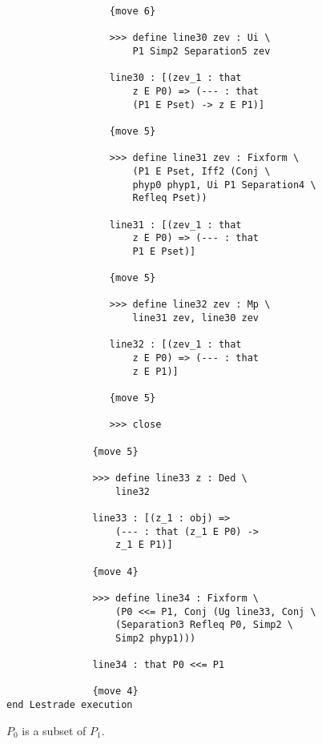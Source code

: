\documentclass[12pt]{article}
\begin{document}
\begin{verbatim}
                  {move 6}

                  >>> define line30 zev : Ui \
                      P1 Simp2 Separation5 zev

                  line30 : [(zev_1 : that 
                      z E P0) => (--- : that 
                      (P1 E Pset) -> z E P1)]

                  {move 5}

                  >>> define line31 zev : Fixform \
                      (P1 E Pset, Iff2 (Conj \
                      phyp0 phyp1, Ui P1 Separation4 \
                      Refleq Pset))

                  line31 : [(zev_1 : that 
                      z E P0) => (--- : that 
                      P1 E Pset)]

                  {move 5}

                  >>> define line32 zev : Mp \
                      line31 zev, line30 zev

                  line32 : [(zev_1 : that 
                      z E P0) => (--- : that 
                      z E P1)]

                  {move 5}

                  >>> close

               {move 5}

               >>> define line33 z : Ded \
                   line32

               line33 : [(z_1 : obj) => 
                   (--- : that (z_1 E P0) -> 
                   z_1 E P1)]

               {move 4}

               >>> define line34 : Fixform \
                   (P0 <<= P1, Conj (Ug line33, Conj \
                   (Separation3 Refleq P0, Simp2 \
                   Simp2 phyp1)))

               line34 : that P0 <<= P1

               {move 4}
end Lestrade execution
\end{verbatim}

$P_0$ is a subset of $P_1$.
\end{document}
